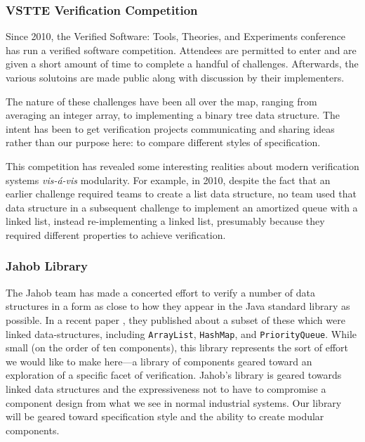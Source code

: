 \subsubsection{VSTTE Verification Competition}\label{sec:competition}
Since 2010, the Verified Software: Tools, Theories, and Experiments conference has run a verified software competition.  Attendees are permitted to enter and are given a short amount of time to complete a handful of challenges.  Afterwards, the various solutoins are made public along with discussion by their implementers.

The nature of these challenges have been all over the map, ranging from averaging an integer array, to implementing a binary tree data structure.  The intent has been to get verification projects communicating and sharing ideas rather than our purpose here: to compare different styles of specification.  

This competition has revealed some interesting realities about modern verification systems \emph{vis-\'{a}-vis} modularity.  For example, in 2010, despite the fact that an earlier challenge required teams to create a list data structure, no team used that data structure in a subsequent challenge to implement an amortized queue with a linked list, instead re-implementing a linked list, presumably because they required different properties to achieve verification.

\subsubsection{Jahob Library}\label{sec:jahoblibrary}
The Jahob team has made a concerted effort to verify a number of data structures in a form as close to how they appear in the Java standard library as possible.  In a recent paper \cite{JahobLinked}, they published about a subset of these which were linked data-structures, including \texttt{ArrayList}, \texttt{HashMap}, and \texttt{PriorityQueue}.  While small (on the order of ten components), this library represents the sort of effort we would like to make here---a library of components geared toward an exploration of a specific facet of verification.  Jahob's library is geared towards linked data structures and the expressiveness not to have to compromise a component design from what we see in normal industrial systems.  Our library will be geared toward specification style and the ability to create modular components.

